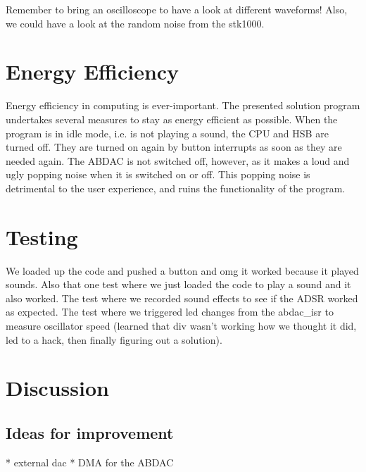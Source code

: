 

Remember to bring an oscilloscope to have a look at different waveforms! Also, we could have a look at the random noise from the stk1000.

\section{Energy Efficiency}

Energy efficiency in computing is ever-important.
The presented solution program undertakes several measures to stay as energy efficient as possible.
When the program is in idle mode, i.e. is not playing a sound, the CPU and HSB are turned off.
They are turned on again by button interrupts as soon as they are needed again.
The ABDAC is not switched off, however, as it makes a loud and ugly popping noise when it is switched on or off.
This popping noise is detrimental to the user experience, and ruins the functionality of the program.

\section{Testing}
We loaded up the code and pushed a button and omg it worked because it played sounds.
Also that one test where we just loaded the code to play a sound and it also worked.
The test where we recorded sound effects to see if the ADSR worked as expected.
The test where we triggered led changes from the abdac_isr to measure oscillator speed (learned that div wasn't working how we thought it did, led to a hack, then finally figuring out a solution).


\section{Discussion}

\subsection{Ideas for improvement}

* external dac
* DMA for the ABDAC

